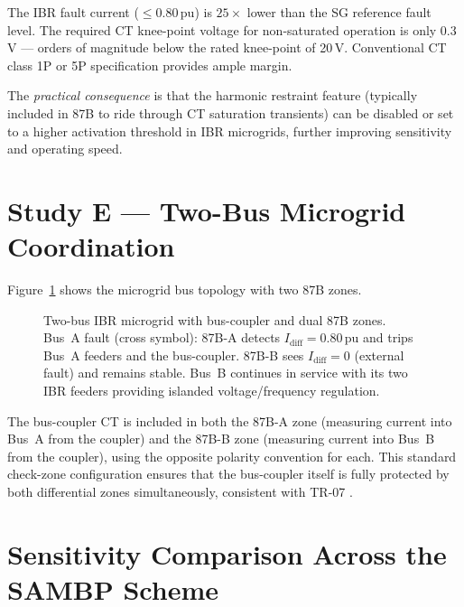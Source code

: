 \documentclass[11pt,a4paper]{article}
\begin{document}
The IBR fault current ($\leq0.80$\,pu) is $25\times$ lower than the SG reference
fault level.  The required CT knee-point voltage for non-saturated operation is
only 0.3\,V --- orders of magnitude below the rated knee-point of 20\,V.
Conventional CT class 1P or 5P specification provides ample margin.

The \emph{practical consequence} is that the harmonic restraint feature
(typically included in 87B to ride through CT saturation transients) can be
disabled or set to a higher activation threshold in IBR microgrids, further
improving sensitivity and operating speed.

\section{Study E --- Two-Bus Microgrid Coordination}
\label{sec:studyE}

Figure~\ref{fig:topology} shows the microgrid bus topology with two 87B zones.

\begin{figure}[htbp]
  \centering
  \resizebox{0.92\textwidth}{!}{}
  \caption{Two-bus IBR microgrid with bus-coupler and dual 87B zones.
           Bus~A fault (cross symbol): 87B-A detects
           $I_\mathrm{diff}=0.80$\,pu and trips Bus~A feeders and the
           bus-coupler.  87B-B sees $I_\mathrm{diff}=0$ (external fault)
           and remains stable.  Bus~B continues in service with its two
           IBR feeders providing islanded voltage/frequency regulation.}
  \label{fig:topology}
\end{figure}

\noindent
The bus-coupler CT is included in both the 87B-A zone (measuring current into
Bus~A from the coupler) and the 87B-B zone (measuring current into Bus~B from
the coupler), using the opposite polarity convention for each.  This standard
check-zone configuration ensures that the bus-coupler itself is fully protected
by both differential zones simultaneously, consistent with TR-07
\cite{SAMBP_TR04}.

\section{Sensitivity Comparison Across the SAMBP Scheme}
\label{sec:comparison}
\end{document}
